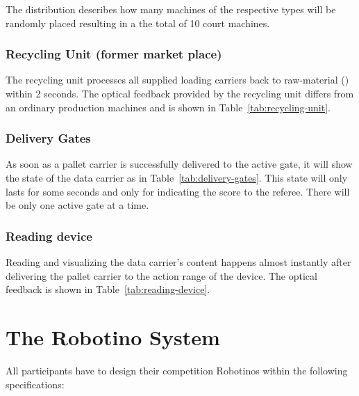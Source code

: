 \documentclass[12pt,twoside]{article}
\begin{document}
The distribution describes how many machines of the respective types
will be randomly placed resulting in a the total of 10 court machines.



\subsubsection{Recycling Unit (former market place)}
The recycling unit processes all supplied loading carriers back to
raw-material () within 2 seconds. The optical feedback provided by
the recycling unit differs from an ordinary production machines and is
shown in Table~\ref{tab:recycling-unit}.

\subsubsection{Delivery Gates} 

As soon as a pallet carrier is successfully delivered to the active
gate, it will show the state of the data carrier as in
Table~\ref{tab:delivery-gates}.  This state will only lasts for some
seconds and only for indicating the score to the referee. There will
be only one active gate at a time.



\subsubsection{Reading device}
Reading and visualizing the data carrier's content happens almost
instantly after delivering the pallet carrier to the action range of
the device. The optical feedback is shown in
Table~\ref{tab:reading-device}.





\section{The Robotino System} \label{sec:robotino}

All participants have to design their competition Robotinos within
the following specifications:
\end{document}

